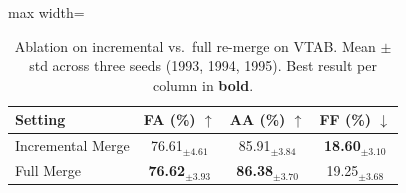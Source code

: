 \begin{table}[!t]
\centering
\caption{Ablation on incremental vs.\ full re-merge on VTAB. Mean $\pm$ std across three seeds (1993, 1994, 1995). Best result per column in \textbf{bold}.}
\label{tab:ablation-merge-incremental}
\renewcommand{\arraystretch}{0.95}
\begin{adjustbox}{max width=\textwidth}
\footnotesize
\begin{tabular}{l c c c}
\toprule
Setting & \textbf{FA (\%)} $\uparrow$ & \textbf{AA (\%)} $\uparrow$ & \textbf{FF (\%)} $\downarrow$ \\
\midrule
Incremental Merge & 76.61$_{\pm 4.61}$ & 85.91$_{\pm 3.84}$ & \textbf{18.60}$_{\pm 3.10}$ \\
Full Merge & \textbf{76.62}$_{\pm 3.93}$ & \textbf{86.38}$_{\pm 3.70}$ & 19.25$_{\pm 3.68}$ \\
\bottomrule
\end{tabular}
\end{adjustbox}
\end{table}